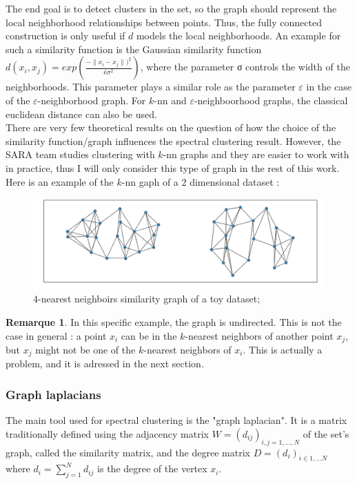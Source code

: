 \documentclass[a4paper,12pt]{article}
\theoremstyle{definition}
\newtheorem*{rem}{Remarque}
\theoremstyle{plain}
\begin{document}
The end goal is to detect clusters in the set, so the graph should represent the local neighborhood relationships between points. Thus, the fully connected construction is only useful if $d$ models the local neighborhoods. An example for such a similarity function is the Gaussian similarity function $d(x_i,x_j)=exp(\frac{-\lVert x_i - x_j \rVert)^2}{é\sigma^2})$, where the parameter σ controls the width of the neighborhoods. This parameter plays a similar role as the parameter $\varepsilon$ in the case of the $\varepsilon$-neighborhood graph.
For $k$-nn and $\varepsilon$-neighboorhood graphs, the classical euclidean distance can also be used.\\

There are very few theoretical results on the question of how the choice of the similarity function/graph influences the spectral clustering result. However, the SARA team studies clustering with $k$-nn graphs and they are easier to work with in practice, thus I will only consider this type of graph in the rest of this work.
Here is an example of the $k$-nn gaph of a $2$ dimensional dataset :

\begin{figure}[H]
	\centering
	\includegraphics[width=0.6\linewidth]{figures/simgraph_example}
	\caption{$4$-nearest neighboirs similarity graph of a toy dataset;}
	\label{fig:sg_example}
\end{figure}
\begin{rem}
	In this specific example, the graph is undirected. This is not the case in general : a point $x_i$ can be in the $k$-nearest neighbors of another point $x_j$, but $x_j$ might not be one of the $k$-nearest neighbors of $x_i$. This is actually a problem, and it is adressed in the next section.
\end{rem}
\subsubsection{Graph laplacians}
The main tool used for spectral clustering is the "graph laplacian". It is a matrix traditionally defined using the adjacency matrix $W=(d_{ij})_{i,j=1,\ldots,N}$ of the set's graph, called the similarity matrix, and the degree matrix $D=(d_i)_{i \in {1,\ldots N}}$ where $d_i=\sum_{j=1}^{N}d_{ij}$ is the degree of the vertex $x_i$.
\end{document}
